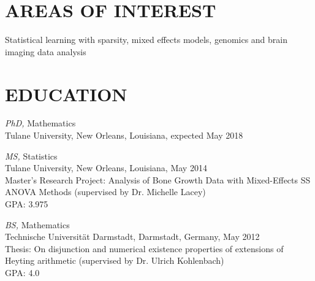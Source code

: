 \documentclass[margin]{res} %
\begin{document}
\begin{resume}
%
%
%
%

\section{AREAS OF INTEREST}

Statistical learning with sparsity, mixed effects models, genomics and brain imaging data analysis


\section{EDUCATION}

{\sl PhD,} Mathematics \\
Tulane University, New Orleans, Louisiana, expected May 2018

{\sl MS,} Statistics \\
Tulane University, New Orleans, Louisiana, May 2014\\
Master's Research Project: Analysis of Bone Growth Data with Mixed-Effects SS ANOVA Methods (supervised by Dr. Michelle Lacey)\\
GPA: 3.975

{\sl BS,} Mathematics\\
Technische Universit\"{a}t Darmstadt, Darmstadt, Germany, May 2012\\
Thesis: On disjunction and numerical existence properties of extensions of Heyting arithmetic (supervised by Dr. Ulrich Kohlenbach)\\
GPA: 4.0


\end{resume}
\end{document}
